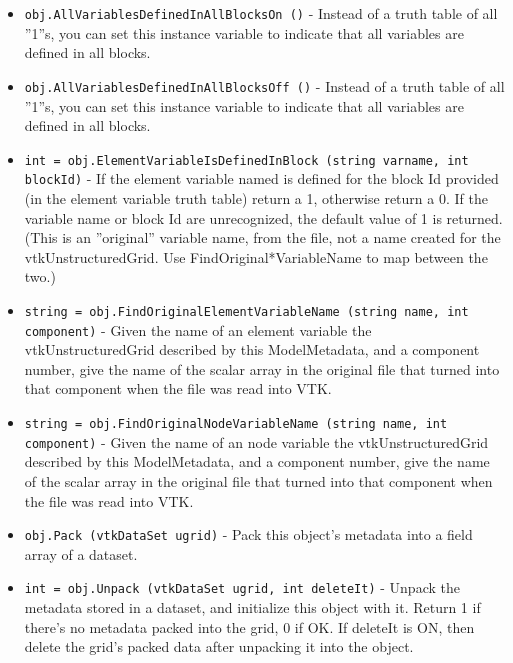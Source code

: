 \begin{itemize}
\item  \verb|obj.AllVariablesDefinedInAllBlocksOn ()| -    Instead of a truth table of all ''1''s, you can set this
   instance variable to indicate that all variables are
   defined in all blocks.

\item  \verb|obj.AllVariablesDefinedInAllBlocksOff ()| -    Instead of a truth table of all ''1''s, you can set this
   instance variable to indicate that all variables are
   defined in all blocks.

\item  \verb|int = obj.ElementVariableIsDefinedInBlock (string varname, int blockId)| -    If the element variable named is defined for the block Id
   provided (in the element variable truth table) return a
   1, otherwise return a 0.  If the variable name or block Id
   are unrecognized, the default value of 1 is returned.
   (This is an ''original'' variable name, from the file,
   not a name created for the vtkUnstructuredGrid.  Use
   FindOriginal*VariableName to map between the two.)

\item  \verb|string = obj.FindOriginalElementVariableName (string name, int component)| -    Given the name of an element variable the vtkUnstructuredGrid
   described by this ModelMetadata, and a component number, give 
   the name of the scalar array in the original
   file that turned into that component when the file was
   read into VTK.

\item  \verb|string = obj.FindOriginalNodeVariableName (string name, int component)| -    Given the name of an node variable the vtkUnstructuredGrid
   described by this ModelMetadata, and a component number, give 
   the name of the scalar array in the original
   file that turned into that component when the file was
   read into VTK.

\item  \verb|obj.Pack (vtkDataSet ugrid)| -    Pack this object's metadata into a field array of a dataset.

\item  \verb|int = obj.Unpack (vtkDataSet ugrid, int deleteIt)| -    Unpack the metadata stored in a dataset,
   and initialize this object with it.  Return 1 if there's
   no metadata packed into the grid, 0 if OK.
   If deleteIt is ON, then delete the grid's packed data after
   unpacking it into the object.


\end{itemize}
